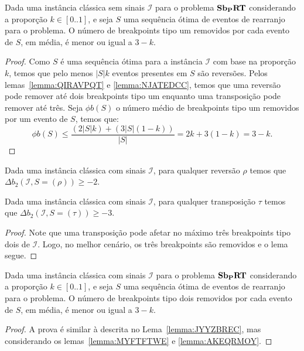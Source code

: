 \begin{lemma}\label{lemma:JYYZBREC}
Dada uma instância clássica sem sinais $\mathcal{I}$ para o problema $\textbf{Sb\textsubscript{P}RT}{}$ considerando a proporção $k \in [0..1]$, e seja $S$ uma sequência ótima de eventos de rearranjo para o problema. O número de breakpoints tipo um removidos por cada evento de $S$, em média, é menor ou igual a $3-k$.
\end{lemma}
\begin{proof}
Como $S$ é uma sequência ótima para a instância $\mathcal{I}$ com base na proporção $k$, temos que pelo menos $|S|k$ eventos presentes em $S$ são reversões. Pelos lemas~\ref{lemma:QIRAVPQT} e \ref{lemma:NJATEDCC}, temos que uma reversão pode remover até dois breakpoints tipo um enquanto uma transposição pode remover até três. Seja $\phi b(S)$ o número médio de breakpoints tipo um removidos por um evento de $S$, temos que:
$$\phi b(S) \le \frac{(2 |S| k) + (3 |S| (1 - k))}{|S|} = 2k + 3(1 - k) = 3 - k.$$ 
\end{proof}

\begin{lemma}\label{lemma:MYFTFTWE}
Dada uma instância clássica com sinais $\mathcal{I}$, para qualquer reversão $\rho$ temos que $\Delta b_2(\mathcal{I}, S = (\rho)) \ge -2$.
\end{lemma}

\begin{lemma}\label{lemma:AKEQRMOY}
Dada uma instância clássica com sinais $\mathcal{I}$, para qualquer transposição $\tau$ temos que $\Delta b_2(\mathcal{I}, S = (\tau)) \ge -3$.
\end{lemma}
\begin{proof}
Note que uma transposição pode afetar no máximo três breakpoints tipo dois de $\mathcal{I}$. Logo, no melhor cenário, os três breakpoints são removidos e o lema segue.
\end{proof}

\begin{lemma}\label{lemma:ZZLNPRWJ}
Dada uma instância clássica com sinais $\mathcal{I}$ para o problema $\textbf{Sb\textsubscript{P}RT}{}$ considerando a proporção $k \in [0..1]$, e seja $S$ uma sequência ótima de eventos de rearranjo para o problema. O número de breakpoints tipo dois removidos por cada evento de $S$, em média, é menor ou igual a $3-k$.
\end{lemma}
\begin{proof}
A prova é similar à descrita no Lema~\ref{lemma:JYYZBREC}, mas considerando os lemas~\ref{lemma:MYFTFTWE} e \ref{lemma:AKEQRMOY}.
\end{proof}

